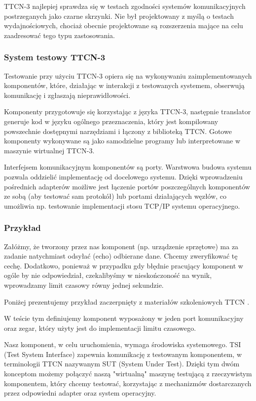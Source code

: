 \documentclass[00-praca-magisterska.tex]{subfiles}
\begin{document}
TTCN-3 najlepiej sprawdza się w testach zgodności systemów komunikacyjnych
postrzeganych jako czarne skrzynki. Nie był projektowany z myślą o testach
wydajnościowych, chociaż obecnie projektowane są rozszerzenia mające na celu
zaadresować tego typu zastosowania.

\subsubsection{System testowy TTCN-3}

Testowanie przy użyciu TTCN-3 opiera się na wykonywaniu zaimplementowanych
komponentów, które, działając w interakcji z testowanych systemem, obserwują
komunikację i zgłaszają nieprawidłowości.

Komponenty przygotowuje się korzystając z języka TTCN-3, następnie translator
generuje kod w języku ogólnego przeznaczenia, który jest kompilowany powszechnie
dostępnymi narzędziami i łączony z biblioteką TTCN. Gotowe komponenty wykonywane
są jako samodzielne programy lub interpretowane w maszynie wirtualnej TTCN-3.

Interfejsem komunikacyjnym komponentów są porty. Warstwowa budowa systemu
pozwala oddzielić implementację od docelowego systemu. Dzięki wprowadzeniu
pośrednich adapterów możliwe jest łączenie portów poszczególnych komponentów ze
sobą (aby testować sam protokół) lub portami działających węzłów, co umożliwia
np. testowanie implementacji stosu TCP/IP systemu operacyjnego.

\subsubsection{Przykład}

Załóżmy, że tworzony przez nas komponent (np. urządzenie sprzętowe) ma za
zadanie natychmiast odsyłać (echo) odbierane dane. Chcemy zweryfikować tę
cechę. Dodatkowo, ponieważ w przypadku gdy błędnie pracujący komponent w ogóle
by nie odpowiedział, czekalibyśmy w nieskończoność na wynik, wprowadzamy limit
czasowy równy jednej sekundzie.

Poniżej prezentujemy przykład zaczerpnięty z materiałów szkoleniowych
TTCN \cite{ttcn-reference}.

W teście tym definiujemy komponent  wyposażony w jeden port
komunikacyjny oraz zegar, który użyty jest do implementacji limitu czasowego.

Nasz komponent, w celu uruchomienia, wymaga środowiska systemowego. TSI (Test
System Interface) zapewnia komunikację z testowanym komponentem, w terminologii
TTCN nazywanym SUT (System Under Test). Dzięki tym dwóm konceptom możemy
połączyć naszą "wirtualną" maszynę testującą z rzeczywistym komponentem, który
chcemy testować, korzystając z mechanizmów dostarczanych przez odpowiedni
adapter oraz system operacyjny.
\end{document}

